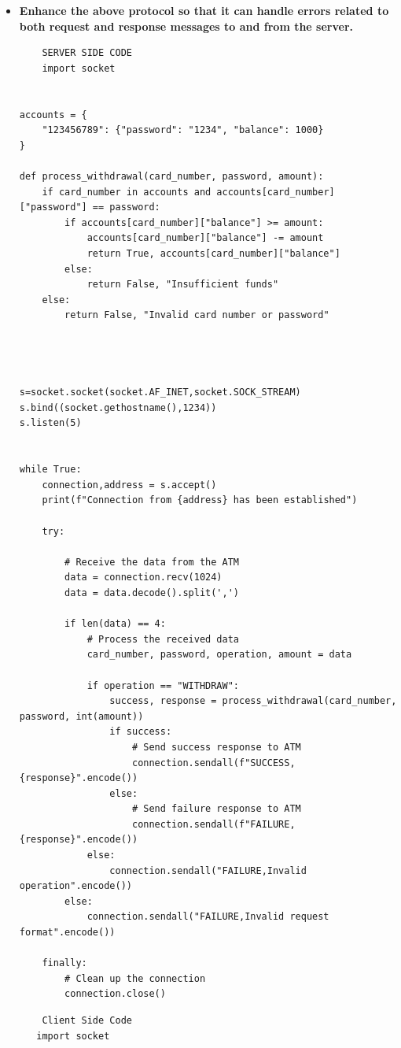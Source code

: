 \documentclass[11pt]{article}
\begin{document}
\begin{itemize}
    \item \textbf{Enhance the above protocol so that it can handle errors related to both
request and response messages to and from the server.}
\begin{verbatim}
    SERVER SIDE CODE
    import socket


accounts = {
    "123456789": {"password": "1234", "balance": 1000}
}

def process_withdrawal(card_number, password, amount):
    if card_number in accounts and accounts[card_number]["password"] == password:
        if accounts[card_number]["balance"] >= amount:
            accounts[card_number]["balance"] -= amount
            return True, accounts[card_number]["balance"]
        else:
            return False, "Insufficient funds"
    else:
        return False, "Invalid card number or password"




s=socket.socket(socket.AF_INET,socket.SOCK_STREAM)
s.bind((socket.gethostname(),1234))
s.listen(5)


while True:
    connection,address = s.accept()
    print(f"Connection from {address} has been established")

    try:
        
        # Receive the data from the ATM
        data = connection.recv(1024)
        data = data.decode().split(',')

        if len(data) == 4:
            # Process the received data
            card_number, password, operation, amount = data

            if operation == "WITHDRAW":
                success, response = process_withdrawal(card_number, password, int(amount))
                if success:
                    # Send success response to ATM
                    connection.sendall(f"SUCCESS,{response}".encode())
                else:
                    # Send failure response to ATM
                    connection.sendall(f"FAILURE,{response}".encode())
            else:
                connection.sendall("FAILURE,Invalid operation".encode())
        else:
            connection.sendall("FAILURE,Invalid request format".encode())

    finally:
        # Clean up the connection
        connection.close()
\end{verbatim}

    \begin{verbatim}
    Client Side Code
   import socket


\end{verbatim}
\end{itemize}
\end{document}
